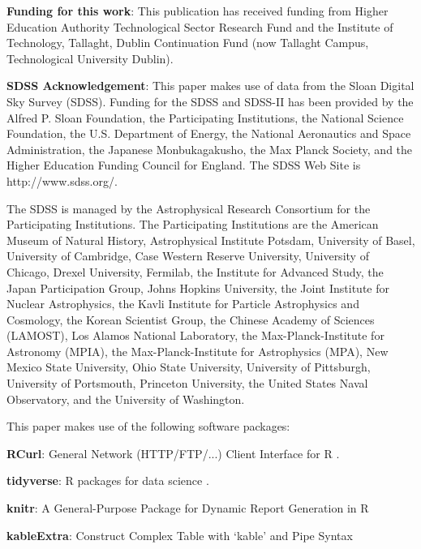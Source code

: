 \documentclass[referee]{aa}
\begin{document}
\begin{acknowledgements}
\textbf{Funding for this work}: This publication has received funding from Higher Education Authority Technological Sector Research Fund and the Institute of Technology, Tallaght, Dublin Continuation Fund (now Tallaght Campus, Technological University Dublin).

\textbf{SDSS Acknowledgement}: This paper makes use of data from the Sloan Digital Sky Survey (SDSS).  Funding for the SDSS and SDSS-II has been provided by the Alfred P. Sloan Foundation, the Participating Institutions, the National Science Foundation, the U.S. Department of Energy, the National Aeronautics and Space Administration, the Japanese Monbukagakusho, the Max Planck Society, and the Higher Education Funding Council for England. The SDSS Web Site is http://www.sdss.org/.

The SDSS is managed by the Astrophysical Research Consortium for the Participating Institutions. The Participating Institutions are the American Museum of Natural History, Astrophysical Institute Potsdam, University of Basel, University of Cambridge, Case Western Reserve University, University of Chicago, Drexel University, Fermilab, the Institute for Advanced Study, the Japan Participation Group, Johns Hopkins University, the Joint Institute for Nuclear Astrophysics, the Kavli Institute for Particle Astrophysics and Cosmology, the Korean Scientist Group, the Chinese Academy of Sciences (LAMOST), Los Alamos National Laboratory, the Max-Planck-Institute for Astronomy (MPIA), the Max-Planck-Institute for Astrophysics (MPA), New Mexico State University, Ohio State University, University of Pittsburgh, University of Portsmouth, Princeton University, the United States Naval Observatory, and the University of Washington.

This paper makes use of the following software packages:

\textbf{RCurl}: General Network (HTTP/FTP/...) Client Interface for R \citep{rcurl}.

\textbf{tidyverse}: R packages for data science \citep{tidyverse}.

\textbf{knitr}: A General-Purpose Package for Dynamic Report Generation in R \citep{knitr1,knitr2,knitr3}

\textbf{kableExtra}: Construct Complex Table with `kable' and Pipe Syntax \citep{kableExtra}

\end{acknowledgements}

\end{document}
